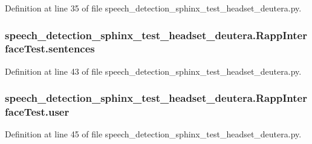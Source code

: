Definition at line 35 of file speech\-\_\-detection\-\_\-sphinx\-\_\-test\-\_\-headset\-\_\-deutera.\-py.

\hypertarget{classspeech__detection__sphinx__test__headset__deutera_1_1RappInterfaceTest_a6edaa4b83158b7f5db2588557b92d435}{
\subsubsection[{sentences}]{\setlength{\rightskip}{0pt plus 5cm}speech\-\_\-detection\-\_\-sphinx\-\_\-test\-\_\-headset\-\_\-deutera.\-Rapp\-Interface\-Test.\-sentences}}\label{classspeech__detection__sphinx__test__headset__deutera_1_1RappInterfaceTest_a6edaa4b83158b7f5db2588557b92d435}


Definition at line 43 of file speech\-\_\-detection\-\_\-sphinx\-\_\-test\-\_\-headset\-\_\-deutera.\-py.

\hypertarget{classspeech__detection__sphinx__test__headset__deutera_1_1RappInterfaceTest_a686651c56a16be26e31073036f004afc}{
\subsubsection[{user}]{\setlength{\rightskip}{0pt plus 5cm}speech\-\_\-detection\-\_\-sphinx\-\_\-test\-\_\-headset\-\_\-deutera.\-Rapp\-Interface\-Test.\-user}}\label{classspeech__detection__sphinx__test__headset__deutera_1_1RappInterfaceTest_a686651c56a16be26e31073036f004afc}


Definition at line 45 of file speech\-\_\-detection\-\_\-sphinx\-\_\-test\-\_\-headset\-\_\-deutera.\-py.

